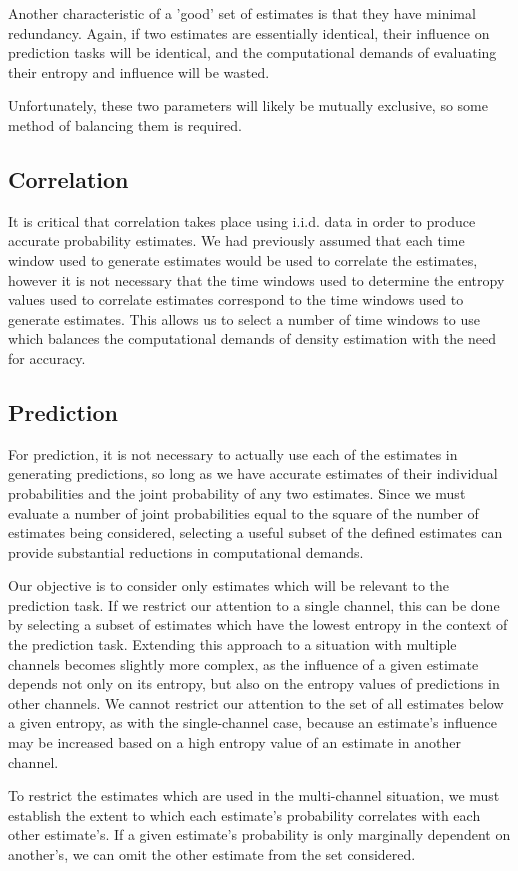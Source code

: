 \documentclass[11pt,titlepage]{article}
\begin{document}
Another characteristic of a 'good' set of estimates is that they have minimal redundancy.  Again, if two estimates are essentially identical, their influence on prediction tasks will be identical, and the computational demands of evaluating their entropy and influence will be wasted. 

Unfortunately, these two parameters will likely be mutually exclusive, so some method of balancing them is required.

\subsection{Correlation}
It is critical that correlation takes place using i.i.d. data in order to produce accurate probability estimates.  We had previously assumed that each time window used to generate estimates would be used to correlate the estimates, however it is not necessary that the time windows used to determine the entropy values used to correlate estimates correspond to the time windows used to generate estimates.  This allows us to select a number of time windows to use which balances the computational demands of density estimation with the need for accuracy.

\subsection{Prediction}
For prediction, it is not necessary to actually use each of the estimates in generating predictions, so long as we have accurate estimates of their individual probabilities and the joint probability of any two estimates.  Since we must evaluate a number of joint probabilities equal to the square of the number of estimates being considered, selecting a useful subset of the defined estimates can provide substantial reductions in computational demands.

Our objective is to consider only estimates which will be relevant to the prediction task.  If we restrict our attention to a single channel, this can be done by selecting a subset of estimates which have the lowest entropy in the context of the prediction task.  Extending this approach to a situation with multiple channels becomes slightly more complex, as the influence of a given estimate depends not only on its entropy, but also on the entropy values of predictions in other channels.  We cannot restrict our attention to the set of all estimates below a given entropy, as with the single-channel case, because an estimate's influence may be increased based on a high entropy value of an estimate in another channel.

To restrict the estimates which are used in the multi-channel situation, we must establish the extent to which each estimate's probability correlates with each other estimate's.  If a given estimate's probability is only marginally dependent on another's, we can omit the other estimate from the set considered.
\end{document}

